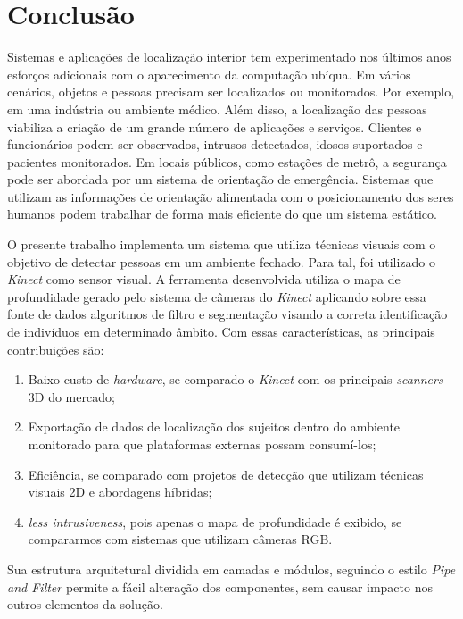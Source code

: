\section{Conclusão}\label{sec:conclusao}

Sistemas e aplicações de localização interior tem experimentado nos últimos anos esforços adicionais com o aparecimento da computação ubíqua. Em vários cenários, objetos e pessoas precisam ser localizados ou monitorados. Por exemplo, em uma indústria ou ambiente médico. Além disso, a localização das pessoas viabiliza a criação de um grande número de aplicações e serviços. Clientes e funcionários podem ser observados, intrusos detectados, idosos suportados e pacientes monitorados. Em locais públicos, como estações de metrô, a segurança pode ser abordada por um sistema de orientação de emergência. Sistemas que utilizam as informações de orientação alimentada com o posicionamento dos seres humanos podem trabalhar de forma mais eficiente do que um sistema estático. 

O presente trabalho implementa um sistema que utiliza técnicas visuais com o objetivo de detectar pessoas em um ambiente fechado. Para tal, foi utilizado o \textit{Kinect} como sensor visual. A ferramenta desenvolvida utiliza o mapa de profundidade gerado pelo sistema de câmeras do \textit{Kinect} aplicando sobre essa fonte de dados algoritmos de filtro e segmentação visando a correta identificação de indivíduos em determinado âmbito.
Com essas características, as principais contribuições são:

\begin{enumerate}
    \item Baixo custo de \textit{hardware}, se comparado o \textit{Kinect} com os principais \textit{scanners} 3D do mercado;  
    \item Exportação de dados de localização dos sujeitos dentro do ambiente monitorado para que plataformas externas possam consumí-los;
    \item Eficiência, se comparado com projetos de detecção que utilizam técnicas visuais 2D e abordagens híbridas;
    \item \textit{less intrusiveness}, pois apenas o mapa de profundidade é exibido, se compararmos com sistemas que utilizam câmeras RGB. 
\end{enumerate}

Sua estrutura arquitetural dividida em camadas e módulos, seguindo o estilo \textit{Pipe and Filter} permite a fácil alteração dos componentes, sem causar impacto nos outros  elementos da solução. 


